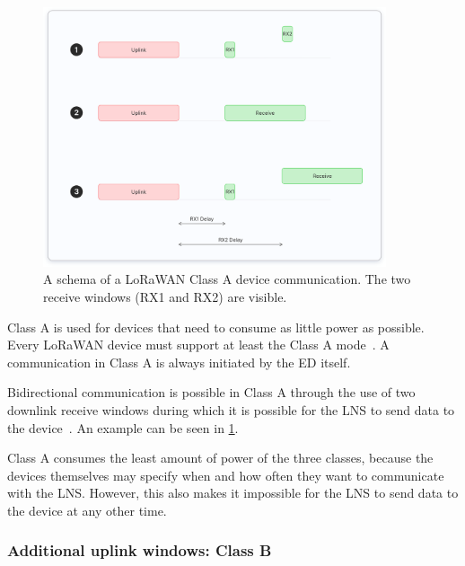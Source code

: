 \begin{figure}[htbp]
    \centering
    \includegraphics[width=0.9\textwidth]{pictures/device-classes/class-a.png}
    \caption{
        A schema of a \ac{LoRaWAN} Class A device communication.
        The two receive windows (RX1 and RX2) are visible.~\protect\cite{the_things_industries_bv_device_nodate}
    }\label{pic:lorawan-device-class-a-schema}
\end{figure}

Class A is used for devices that need to consume as little power as possible.
Every \ac{LoRaWAN} device must support at least the Class A mode~\cite[p. 11]{lora_alliance_inc_lorawan_specification_2017}.
A communication in Class A is always initiated by the \acl{ED} itself.

Bidirectional communication is possible in Class A through the use of two downlink receive windows during which it is possible for the \ac{LNS} to send data to the device~\cite[p. 13]{lora_alliance_inc_lorawan_specification_2017}.
An example can be seen in \cref{pic:lorawan-device-class-a-schema}.

Class A consumes the least amount of power of the three classes, because the devices themselves may specify when and how often they want to communicate with the \ac{LNS}.
However, this also makes it impossible for the \ac{LNS} to send data to the device at any other time.

\subsubsection{Additional uplink windows: Class B}

